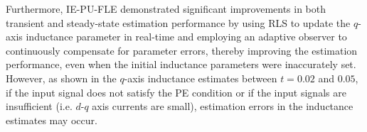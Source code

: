Furthermore, IE-PU-FLE demonstrated significant improvements in both transient and steady-state estimation performance by using RLS to update the $q$-axis inductance parameter in real-time and employing an adaptive observer to continuously compensate for parameter errors, thereby improving the estimation performance, even when the initial inductance parameters were inaccurately set. However, as shown in the $q$-axis inductance estimates between $t=0.02$ and $0.05$, if the input signal does not satisfy the PE condition or if the input signals are insufficient (i.e. $d$-$q$ axis currents are small), estimation errors in the inductance estimates may occur.




